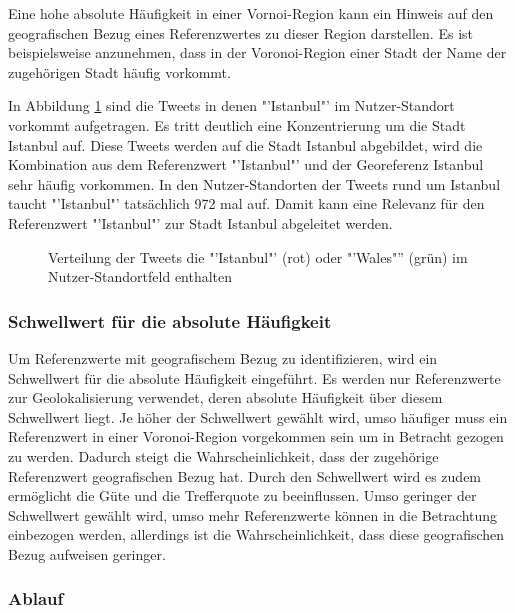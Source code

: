 			Eine hohe absolute Häufigkeit in einer Vornoi-Region kann ein Hinweis auf den geografischen Bezug eines Referenzwertes zu dieser Region darstellen. 
			Es ist beispielsweise anzunehmen, dass in der Voronoi-Region einer Stadt der Name der zugehörigen Stadt häufig vorkommt.

			In Abbildung \ref{img:ulIstanbulWalesZoom} sind die Tweets in denen "'Istanbul"' im Nutzer-Standort vorkommt aufgetragen.
			Es tritt deutlich eine Konzentrierung um die Stadt Istanbul auf. 
			Diese Tweets werden auf die Stadt Istanbul abgebildet, wird die Kombination aus dem Referenzwert "'Istanbul"' und der Georeferenz Istanbul sehr häufig vorkommen.
			In den Nutzer-Standorten der Tweets rund um Istanbul taucht "'Istanbul"' tatsächlich 972 mal auf.
			Damit kann eine Relevanz für den Referenzwert "'Istanbul"' zur Stadt Istanbul abgeleitet werden.

			\begin{figure}[!ht]
					\centering
						\caption{Verteilung der Tweets die "'Istanbul"' (rot) oder "'Wales"'' (grün) im Nutzer-Standortfeld enthalten}
						\label{img:ulIstanbulWalesZoom}


			\end{figure}	


			\subsubsection{Schwellwert für die absolute Häufigkeit} 

				Um Referenzwerte mit geografischem Bezug zu identifizieren, wird ein Schwellwert für die absolute Häufigkeit eingeführt.
				Es werden nur Referenzwerte zur Geolokalisierung verwendet, deren absolute Häufigkeit über diesem Schwellwert liegt.
				Je höher der Schwellwert gewählt wird, umso häufiger muss ein Referenzwert in einer Voronoi-Region vorgekommen sein um in Betracht gezogen zu werden.
				Dadurch steigt die Wahrscheinlichkeit, dass der zugehörige Referenzwert geografischen Bezug hat. 
				Durch den Schwellwert wird es zudem ermöglicht die Güte und die Trefferquote zu beeinflussen.
				Umso geringer der Schwellwert gewählt wird, umso mehr Referenzwerte können in die Betrachtung einbezogen werden, allerdings ist die Wahrscheinlichkeit, dass diese geografischen Bezug aufweisen geringer.  

			\subsubsection{Ablauf}

